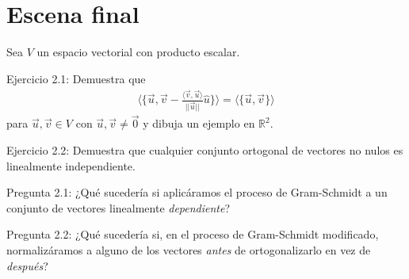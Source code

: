 \documentclass[12pt,dvipsnames]{article}
\numberwithin{equation}{section}
\begin{document}
\newpage
\section{Escena final}

\begin{center}
    Sea $V$ un espacio vectorial con producto escalar.
\end{center}

Ejercicio 2.1: Demuestra que
\begin{align*}
    \bigg\langle \bigg\{\vec{u}, \vec{v} - \frac{\langle \vec{v}, \vec{u}\rangle}{||\vec{u}||}\hat{u} \bigg\}\bigg\rangle = \langle \{\vec{u},\vec{v}\} \rangle
\end{align*} para $\vec{u},\vec{v}\in V$ con $\vec{u},\vec{v}\neq\vec{0}$ y dibuja un ejemplo en $\mathbb{R}^2$.

\vspace{5mm}

Ejercicio 2.2: Demuestra que cualquier conjunto ortogonal de vectores no nulos es linealmente independiente.

\vspace{5mm}

Pregunta 2.1: ¿Qué sucedería si aplicáramos el proceso de Gram-Schmidt a un conjunto de vectores linealmente \emph{dependiente}?

Pregunta 2.2: ¿Qué sucedería si, en el proceso de Gram-Schmidt modificado, normalizáramos a alguno de los vectores \emph{antes} de ortogonalizarlo en vez de  \emph{después}?
\end{document}
